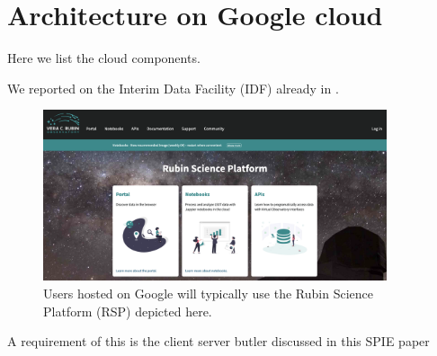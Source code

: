 \section{Architecture on Google cloud} \label{sec:google}

Here we list the cloud components.

We reported on the Interim Data Facility (IDF) already in \cite{2021arXiv211115030O}.


\begin{figure}
\begin{centering}
\includegraphics[width=0.9\textwidth]{RSP.png}
	\caption{ Users hosted on Google will typically use the Rubin Science Platform (RSP) depicted here.  \label{fig:goglearch}}
\end{centering}
\end{figure}


A requirement of this is the client server butler discussed  in this SPIE paper \cite{2024SPIE13101.129Jtmp}
